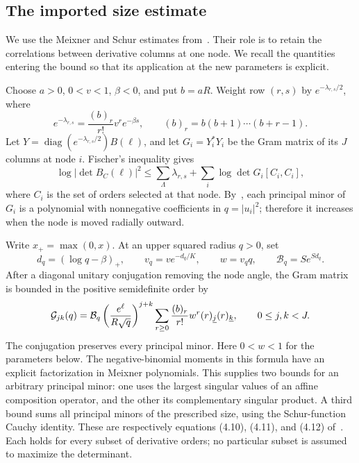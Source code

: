 \subsection{The imported size estimate}
We use the Meixner and Schur estimates from~\cite[Section~4]{chung498}.
Their role is to retain the correlations between derivative columns at
one node. We recall the quantities entering the bound so that its
application at the new parameters is explicit.

Choose $a>0$, $0<v<1$, $\beta<0$, and put $b=aR$. Weight row $(r,s)$ by
$e^{-\lambda_{r,s}/2}$, where
\[
 e^{-\lambda_{r,s}}=\frac{(b)_r}{r!}v^r e^{-\beta s},
 \qquad (b)_r=b(b+1)\cdots(b+r-1).
\]
Let $Y=\operatorname{diag}(e^{-\lambda_{r,s}/2})B(\ell)$, and let $G_i=Y_i^*Y_i$
be the Gram matrix of its $J$ columns at node $i$. Fischer's inequality gives
\begin{equation}\label{eq:fischer}
 \log|\det B_C(\ell)|^2
 \leq\sum_\Lambda\lambda_{r,s}
       +\sum_i\log\det G_i[C_i,C_i],
\end{equation}
where $C_i$ is the set of orders selected at that node. By~\cite[Lemma~4.1]{chung498}, each principal minor
of $G_i$ is a polynomial with nonnegative coefficients in $q=|u_i|^2$;
therefore it increases when the node is moved radially outward.

Write $x_+=\max(0,x)$. At an upper squared radius $q>0$, set
\[
 d_q=(\log q-\beta)_+,\qquad v_q=ve^{-d_q/K},\qquad
 w=v_qq,\qquad \mathcal B_q=S e^{Sd_q}.
\]
After a diagonal unitary conjugation removing the node angle, the Gram
matrix is bounded in the positive semidefinite order by
\begin{equation}\label{eq:moment-matrix}
 \mathcal G_{jk}(q)=\mathcal B_q
 \left(\frac{e^\ell}{R\sqrt q}\right)^{j+k}
 \sum_{r\geq0}\frac{(b)_r}{r!}w^r(r)_{\underline{j}}(r)_{\underline{k}},
 \qquad 0\leq j,k<J.
\end{equation}
The conjugation preserves every principal minor. Here $0<w<1$ for the
parameters below. The negative-binomial moments in
this formula have an explicit factorization in Meixner polynomials. This
supplies two bounds for an arbitrary principal minor: one uses the largest
singular values of an affine composition operator, and the other its
complementary singular product. A third bound sums all principal minors of
the prescribed size, using the Schur-function Cauchy identity. These are
respectively equations (4.10), (4.11), and (4.12) of~\cite{chung498}.
Each holds for every subset of derivative orders; no particular subset is
assumed to maximize the determinant.

